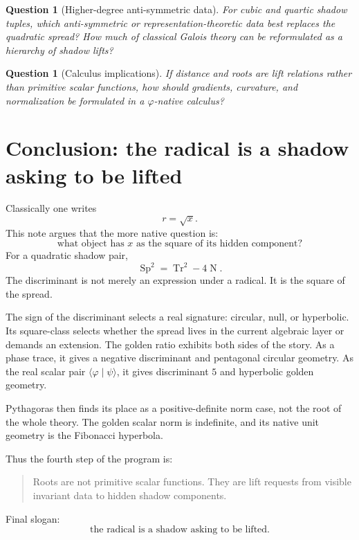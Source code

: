 \documentclass[11pt]{article}
\newtheorem{question}[definition]{Question}
\newcommand{\Tr}{\operatorname{Tr}}
\newcommand{\Nm}{\operatorname{N}}
\newcommand{\Sp}{\operatorname{Sp}}
\newcommand{\ph}{\varphi}
\newcommand{\ps}{\psi}
\begin{document}
\begin{question}[Higher-degree anti-symmetric data]
For cubic and quartic shadow tuples, which anti-symmetric or representation-theoretic data best replaces the quadratic spread?  How much of classical Galois theory can be reformulated as a hierarchy of shadow lifts?
\end{question}

\begin{question}[Calculus implications]
If distance and roots are lift relations rather than primitive scalar functions, how should gradients, curvature, and normalization be formulated in a $\ph$-native calculus?
\end{question}

\section{Conclusion: the radical is a shadow asking to be lifted}

Classically one writes
\[
    r=\sqrt{x}.
\]
This note argues that the more native question is:
\[
    \text{what object has }x\text{ as the square of its hidden component?}
\]
For a quadratic shadow pair,
\[
    \Sp^2=\Tr^2-4\Nm.
\]
The discriminant is not merely an expression under a radical.  It is the square of the spread.

The sign of the discriminant selects a real signature: circular, null, or hyperbolic.  Its square-class selects whether the spread lives in the current algebraic layer or demands an extension.  The golden ratio exhibits both sides of the story.  As a phase trace, it gives a negative discriminant and pentagonal circular geometry.  As the real scalar pair $\langle\ph\mid\ps\rangle$, it gives discriminant $5$ and hyperbolic golden geometry.

Pythagoras then finds its place as a positive-definite norm case, not the root of the whole theory.  The golden scalar norm is indefinite, and its native unit geometry is the Fibonacci hyperbola.

Thus the fourth step of the program is:
\begin{quote}
Roots are not primitive scalar functions.  They are lift requests from visible invariant data to hidden shadow components.
\end{quote}

Final slogan:
\[
    \boxed{\text{the radical is a shadow asking to be lifted.}}
\]
\end{document}
